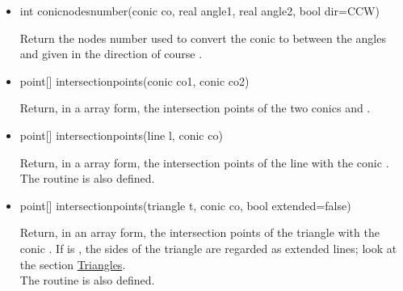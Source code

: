 \documentclass[pdftex]{article}
\begin{document}
\begin{itemize}
\item {}
  \begin{Vcolor}
    int conicnodesnumber(conic co, real angle1, real angle2, bool dir=CCW)
  \end{Vcolor}
  Return the nodes number used to convert the conic  to
   between the angles  and 
  given in the direction of course .
\item {}
  \begin{Vcolor}
    point[] intersectionpoints(conic co1, conic co2)
  \end{Vcolor}
  Return, in a array form, the intersection points of the two conics
   and .
\item {}
  \begin{Vcolor}
    point[] intersectionpoints(line l, conic co)
  \end{Vcolor}
  Return, in a array form, the intersection points of the
  line  with the conic .\\
  The routine  is also defined.
\item {}
  \begin{Vcolor}
    point[] intersectionpoints(triangle t, conic co, bool extended=false)
  \end{Vcolor}
  Return, in an array form, the intersection points of the
  triangle  with the conic . If  is
  , the sides of the triangle are regarded as extended
  lines; look at the section \href{#section.triangles}{Triangles}.\\
  The routine  is also defined.
\end{itemize}
\end{document}

